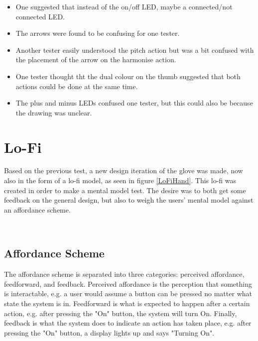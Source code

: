 \begin{itemize}
	\item One suggested that instead of the on/off LED, maybe a connected/not connected LED.
	\item The arrows were found to be confusing for one tester.
	\item Another tester easily understood the pitch action but was a bit confused with the placement of the arrow on the harmonise action.
	\item One tester thought tht the dual colour on the thumb suggested that both actions could be done at the same time.
	\item The plus and minus LEDs confused one tester, but this could also be because the drawing was unclear.
\end{itemize} 

\section{Lo-Fi}

Based on the previous test, a new design iteration of the glove was made, now also in the form of a lo-fi model, as seen in figure \ref{LoFiHand}. This lo-fi was created in order to make a mental model test. The desire was to both get some feedback on the general design, but also to weigh the users' mental model against an affordance scheme.\\

\begin{minipage}{\linewidth}%
\label{LoFiHand}
\end{minipage}\\

\subsection{Affordance Scheme}
The affordance scheme is separated into three categories: perceived affordance, feedforward, and feedback. Perceived affordance is the perception that something is interactable, e.g. a user would assume a button can be pressed no matter what state the system is in. Feedforward is what is expected to happen after a certain action, e.g. after pressing the "On" button, the system will turn On. Finally, feedback is what the system does to indicate an action has taken place, e.g. after pressing the "On" button, a display lights up and says "Turning On".

